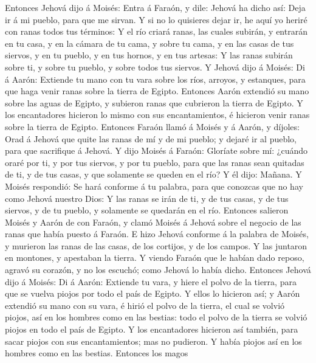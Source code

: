  Entonces Jehová dijo á Moisés: Entra á Faraón, y dile:
Jehová ha dicho así: Deja ir á mi pueblo, para que me sirvan.
 Y si no lo quisieres dejar ir, he aquí yo heriré con ranas
todos tus términos:  Y el río criará ranas, las cuales
subirán, y entrarán en tu casa, y en la cámara de tu cama, y sobre tu
cama, y en las casas de tus siervos, y en tu pueblo, y en tus hornos, y
en tus artesas:  Y las ranas subirán sobre ti, y sobre tu
pueblo, y sobre todos tus siervos.  Y Jehová dijo á Moisés:
Di á Aarón: Extiende tu mano con tu vara sobre los ríos, arroyos, y
estanques, para que haga venir ranas sobre la tierra de Egipto.
 Entonces Aarón extendió su mano sobre las aguas de Egipto,
y subieron ranas que cubrieron la tierra de Egipto.  Y los
encantadores hicieron lo mismo con sus encantamientos, é hicieron venir
ranas sobre la tierra de Egipto.  Entonces Faraón llamó á
Moisés y á Aarón, y díjoles: Orad á Jehová que quite las ranas de mí y
de mi pueblo; y dejaré ir al pueblo, para que sacrifique á Jehová.
 Y dijo Moisés á Faraón: Gloríate sobre mí: ¿cuándo oraré
por ti, y por tus siervos, y por tu pueblo, para que las ranas sean
quitadas de ti, y de tus casas, y que solamente se queden en el río?
 Y él dijo: Mañana. Y Moisés respondió: Se hará conforme á
tu palabra, para que conozcas que no hay como Jehová nuestro Dios:
 Y las ranas se irán de ti, y de tus casas, y de tus
siervos, y de tu pueblo, y solamente se quedarán en el río.
 Entonces salieron Moisés y Aarón de con Faraón, y clamó
Moisés á Jehová sobre el negocio de las ranas que había puesto á Faraón.
 E hizo Jehová conforme á la palabra de Moisés, y murieron
las ranas de las casas, de los cortijos, y de los campos. 
Y las juntaron en montones, y apestaban la tierra.  Y
viendo Faraón que le habían dado reposo, agravó su corazón, y no los
escuchó; como Jehová lo había dicho.  Entonces Jehová dijo
á Moisés: Di á Aarón: Extiende tu vara, y hiere el polvo de la tierra,
para que se vuelva piojos por todo el país de Egipto.  Y
ellos lo hicieron así; y Aarón extendió su mano con su vara, é hirió el
polvo de la tierra, el cual se volvió piojos, así en los hombres como en
las bestias: todo el polvo de la tierra se volvió piojos en todo el país
de Egipto.  Y los encantadores hicieron así también, para
sacar piojos con sus encantamientos; mas no pudieron. Y había piojos así
en los hombres como en las bestias.  Entonces los magos
